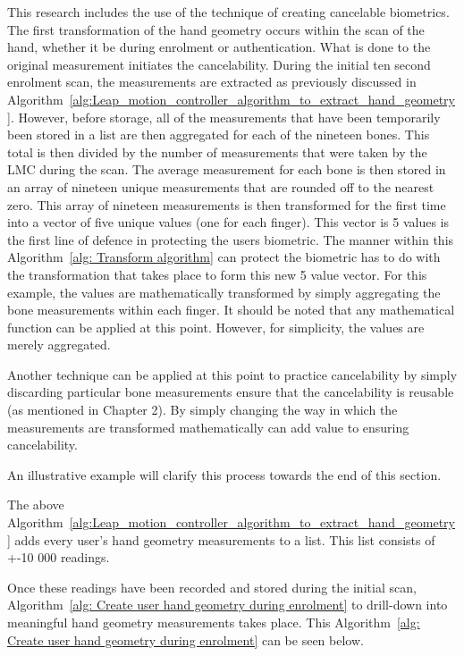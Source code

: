 This research includes the use of the technique of creating cancelable biometrics. The first transformation of the hand geometry occurs within the scan of the hand, whether it be during enrolment or authentication. What is done to the original measurement initiates the cancelability. During the initial ten second enrolment scan, the measurements are extracted as previously discussed in Algorithm~\ref{alg:Leap_motion_controller_algorithm_to_extract_hand_geometry}. However, before storage, all of the measurements that have been temporarily been stored in a list are then aggregated for each of the nineteen bones. This total is then divided by the number of measurements that were taken by the LMC during the scan. The average measurement for each bone is then stored in an array of nineteen unique measurements that are rounded off to the nearest zero. This array of nineteen measurements is then transformed for the first time into a vector of five unique values (one for each finger). This vector is 5 values is the first line of defence in protecting the users biometric. The manner within this Algorithm~\ref{alg: Transform algorithm} can protect the biometric has to do with the transformation that takes place to form this new 5 value vector. For this example, the values are mathematically transformed by simply aggregating the bone measurements within each finger. It should be noted that any mathematical function can be applied at this point. However, for simplicity, the values are merely aggregated. 

Another technique can be applied at this point to practice cancelability by simply discarding particular bone measurements ensure that the cancelability is reusable (as mentioned in Chapter 2). By simply changing the way in which the measurements are transformed mathematically can add value to ensuring cancelability. 

An illustrative example will clarify this process towards the end of this section.


The above Algorithm~\ref{alg:Leap_motion_controller_algorithm_to_extract_hand_geometry} adds every user's hand geometry measurements to a list. This list consists of +-10 000 readings.

Once these readings have been recorded and stored during the initial scan, Algorithm~\ref{alg: Create user hand geometry during enrolment} to drill-down into meaningful hand geometry measurements takes place. This Algorithm~\ref{alg: Create user hand geometry during enrolment} can be seen below.

